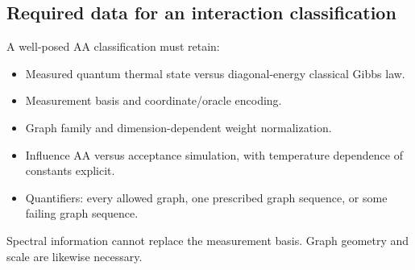 \subsection{Required data for an interaction
classification}\label{quant:sec-6}
\enlargethispage{\baselineskip}

A well-posed AA classification must retain:

\begin{itemize}
\tightlist
\item
  Measured quantum thermal state versus diagonal-energy classical Gibbs
  law.
\item
  Measurement basis and coordinate/oracle encoding.
\item
  Graph family and dimension-dependent weight normalization.
\item
  Influence AA versus acceptance simulation, with temperature dependence
  of constants explicit.
\item
  Quantifiers: every allowed graph, one prescribed graph sequence, or
  some failing graph sequence.
\end{itemize}

Spectral information cannot replace the measurement basis. Graph
geometry and scale are likewise necessary.
